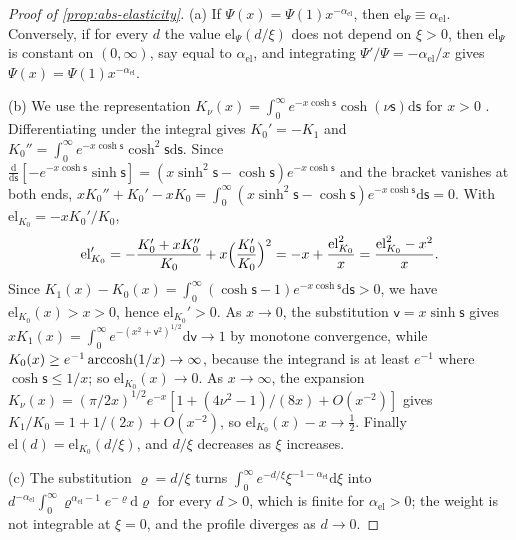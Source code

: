 \begin{proof}[Proof of \cref{prop:abs-elasticity}]
(a) If $\Psi(x)=\Psi(1)x^{-\alpha_{\mathrm{el}}}$, then $\mathrm{el}_\Psi\equiv\alpha_{\mathrm{el}}$. Conversely, if for every $d$ the value $\mathrm{el}_\Psi(d/\xi)$ does not depend on $\xi>0$, then $\mathrm{el}_\Psi$ is constant on $(0,\infty)$, say equal to $\alpha_{\mathrm{el}}$, and integrating $\Psi'/\Psi=-\alpha_{\mathrm{el}}/x$ gives $\Psi(x)=\Psi(1)x^{-\alpha_{\mathrm{el}}}$.

(b) We use the representation $K_\nu(x)=\int_0^\infty e^{-x\cosh\mathsf s}\cosh(\nu\mathsf s)\mathrm d\mathsf s$ for $x>0$ \citep[eq.~10.32.9]{olver2010nist}. Differentiating under the integral gives $K_0'=-K_1$ and $K_0''=\int_0^\infty e^{-x\cosh\mathsf s}\cosh^2\mathsf s\mathrm d\mathsf s$. Since $\frac{\mathrm d}{\mathrm d\mathsf s}[-e^{-x\cosh\mathsf s}\sinh\mathsf s]=(x\sinh^2\mathsf s-\cosh\mathsf s)e^{-x\cosh\mathsf s}$ and the bracket vanishes at both ends, $xK_0''+K_0'-xK_0=\int_0^\infty(x\sinh^2\mathsf s-\cosh\mathsf s)e^{-x\cosh\mathsf s}\mathrm d\mathsf s=0$. With $\mathrm{el}_{K_0}=-xK_0'/K_0$,
\[
\mathrm{el}_{K_0}'=-\frac{K_0'+xK_0''}{K_0}+x\Bigl(\frac{K_0'}{K_0}\Bigr)^2=-x+\frac{\mathrm{el}_{K_0}^2}x=\frac{\mathrm{el}_{K_0}^2-x^2}x.
\]
Since $K_1(x)-K_0(x)=\int_0^\infty(\cosh\mathsf s-1)e^{-x\cosh\mathsf s}\mathrm d\mathsf s>0$, we have $\mathrm{el}_{K_0}(x)>x>0$, hence $\mathrm{el}_{K_0}'>0$. As $x\to0$, the substitution $\mathsf v=x\sinh\mathsf s$ gives $xK_1(x)=\int_0^\infty e^{-(x^2+\mathsf v^2)^{1/2}}\mathrm d\mathsf v\to1$ by monotone convergence, while $K_0(x)\ge e^{-1}\operatorname{arccosh}(1/x)\to\infty$, because the integrand is at least $e^{-1}$ where $\cosh\mathsf s\le1/x$; so $\mathrm{el}_{K_0}(x)\to0$. As $x\to\infty$, the expansion $K_\nu(x)=(\pi/2x)^{1/2}e^{-x}[1+(4\nu^2-1)/(8x)+O(x^{-2})]$ \citep[eqs.~10.40.2 and 10.17.1]{olver2010nist} gives $K_1/K_0=1+1/(2x)+O(x^{-2})$, so $\mathrm{el}_{K_0}(x)-x\to\frac12$. Finally $\mathrm{el}(d)=\mathrm{el}_{K_0}(d/\xi)$, and $d/\xi$ decreases as $\xi$ increases.

(c) The substitution $\varrho=d/\xi$ turns $\int_0^\infty e^{-d/\xi}\xi^{-1-\alpha_{\mathrm{el}}}\mathrm d\xi$ into $d^{-\alpha_{\mathrm{el}}}\int_0^\infty\varrho^{\alpha_{\mathrm{el}}-1}e^{-\varrho}\mathrm d\varrho$ for every $d>0$, which is finite for $\alpha_{\mathrm{el}}>0$; the weight is not integrable at $\xi=0$, and the profile diverges as $d\to0$.
\end{proof}


